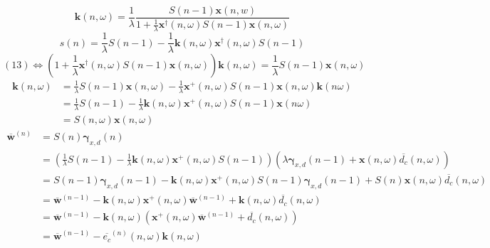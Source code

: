 \documentclass[12pt]{article}
\begin{document}
\begin{equation}
    \mathbf{k}(n,\omega) = \frac{1}{\lambda} \frac{S(n-1) \mathbf{x}(n,w)}{1 + \frac{1}{\lambda} \mathbf{x}^\dag(n,\omega) S(n-1) \mathbf{x}(n,\omega)} \nonumber
\end{equation}
\begin{equation}
    s(n) = \frac{1}{\lambda} S(n-1) - \frac{1}{\lambda} \mathbf{k}(n,\omega) \mathbf{x}^\dag(n,\omega) S(n-1) \nonumber
\end{equation}
\begin{equation}
    (13) \Leftrightarrow \left( 1 + \frac{1}{\lambda} \mathbf{x}^\dag(n,\omega) S(n-1) \mathbf{x}(n,\omega) \right) \mathbf{k}(n,\omega)=\frac{1}{\lambda}S(n-1)\mathbf{x}(n,\omega) \nonumber
\end{equation}
\begin{align}
    \mathbf{k}(n,\omega) &= \frac{1}{\lambda}S(n-1) \mathbf{x}(n,\omega) - \frac{1}{\lambda} \mathbf{x}^+(n,\omega) S(n-1)\mathbf{x}(n,\omega) \mathbf{k}(n\omega) \nonumber \\
    &= \frac{1}{\lambda} S(n-1) - \frac{1}{\lambda} \mathbf{k}(n,\omega) \mathbf{x}^+(n,\omega) S(n-1) \mathbf{x}(n\omega) \nonumber \\
    &= S(n,\omega) \mathbf{x}(n,\omega) \nonumber
\end{align}
\begin{align}
    \overline{\mathbf{w}}^{(n)} &= S(n) \mathbf{\gamma}_{x,d}(n) \nonumber \\
    &= \left( \frac{1}{\lambda} S(n-1) - \frac{1}{\lambda} \mathbf{k}(n,\omega) \mathbf{x}^+(n,\omega) S(n-1) \right) \left( \lambda \mathbf{\gamma}_{x,d}(n-1) + \mathbf{x}(n,\omega)\overline{d_c}(n,\omega) \right) \nonumber \\
    &= S(n-1) \mathbf{\gamma}_{x,d}(n-1) - \mathbf{k}(n,\omega) \mathbf{x}^+(n,\omega) S(n-1) \mathbf{\gamma}_{x,d}(n-1) + S(n) \mathbf{x}(n,\omega)\overline{d_c}(n,\omega) \nonumber  \\
    &= \overline{\mathbf{w}}^{(n-1)} - \mathbf{k}(n,\omega) \mathbf{x}^+(n,\omega) \overline{\mathbf{w}}^{(n-1)}+ \mathbf{k}(n,\omega) \overline{d_c}(n,\omega) \nonumber \\
    &= \overline{\mathbf{w}}^{(n-1)} - \mathbf{k}(n,\omega) \left( \mathbf{x}^+(n,\omega) \overline{\mathbf{w}}^{(n-1)}+ \overline{d_c}(n,\omega) \right) \nonumber \\
    &= \overline{\mathbf{w}}^{(n-1)} - \overline{e_c}^{(n)}(n,\omega) \mathbf{k}(n,\omega) \nonumber 
\end{align}
\end{document}
